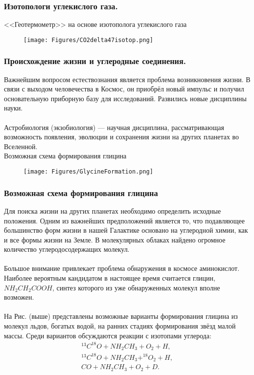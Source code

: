 \begin{frame}
\frametitle{Изотопологи углекислого газа.}
<<Геотермометр>> на основе изотополога углекислого газа
\begin{figure}[h]
	\centering
	\texttt{[image: Figures/CO2delta47isotop.png]}
	\label{fig:CO2delta47isotop}
\end{figure}



\end{frame}


\begin{frame}
\frametitle{Происхождение жизни и углеродные соединения.}

{\footnotesize
Важнейшим вопросом естествознания является проблема возникновения жизни. В связи с выходом человечества в Космос, он приобрёл новый импульс и получил основательную приборную базу для исследований. Развились новые дисциплины науки.\\
~\\
Астробиология (экзобиология) --- 
научная дисциплина, рассматривающая возможность появления, эволюции и сохранения жизни на других планетах во Вселенной. \\
Возможная схема формирования глицина }

\begin{figure}[h]
	\centering
	\texttt{[image: Figures/GlycineFormation.png]}
	\label{fig:GlycineFormation}
\end{figure}

\end{frame}


\begin{frame}
\frametitle{Возможная схема формирования глицина}

{\small
Для поиска жизни на других планетах необходимо определить исходные положения. Одним из важнейших предположений является то, что подавляющее большинство форм жизни в нашей Галактике основано на углеродной химии, как и все формы жизни на Земле. В молекулярных облаках найдено огромное количество углеродосодержащих молекул. \\
~\\
Большое внимание привлекает проблема обнаружения в космосе аминокислот. 
Наиболее вероятным кандидатом в настоящее время считается глицин, $NH_2CH_2COOH$, синтез которого из уже обнаруженных молекул вполне возможен.\\
~\\
На Рис. (выше) представлены возможные варианты формирования глицина из молекул льдов, богатых водой, на ранних стадиях формирования звёзд малой массы.
Среди вариантов обсуждаются реакции с изотопами углерода:
\begin{align*}
^{13}C^{18}O + NH_2CH_3 + O_2 + H, \\
^{13}C^{18}O + NH_2CH_3  + ^{18}O_2 + H,\\
CO + NH_2CH_3  + O_2 + D.
\end{align*}
}
\end{frame}

